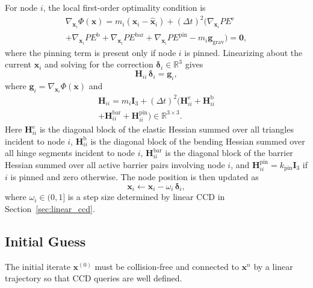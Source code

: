 \documentclass[acmtog,anonymous,review]{acmart}
\begin{document}
For node $i$, the local first-order optimality condition is
\begin{multline}
\label{eq:local_opt}
\nabla_{\mathbf{x}_i}\Phi(\mathbf{x})
=
m_i(\mathbf{x}_i-\hat{\mathbf{x}}_i)
+
(\Delta t)^2
\bigl(
\nabla_{\mathbf{x}_i}PE^{\mathrm{e}}
\\
+\nabla_{\mathbf{x}_i}PE^{\mathrm{b}}
+\nabla_{\mathbf{x}_i}PE^{\mathrm{bar}}
+\nabla_{\mathbf{x}_i}PE^{\mathrm{pin}}
-m_i\mathbf{g}_{\mathrm{grav}}
\bigr)
=\mathbf{0},
\end{multline}
where the pinning term is present only if node $i$ is pinned.
Linearizing about the current $\mathbf{x}_i$ and solving for the
correction $\boldsymbol{\delta}_i\in\mathbb{R}^3$ gives
\begin{equation}
\label{eq:local_newton}
\mathbf{H}_{ii}\,\boldsymbol{\delta}_i = \mathbf{g}_i,
\end{equation}
where $\mathbf{g}_i=\nabla_{\mathbf{x}_i}\Phi(\mathbf{x})$ and
\begin{multline}
\label{eq:local_hessian}
\mathbf{H}_{ii}
=
m_i\mathbf{I}_3
+
(\Delta t)^2
\bigl(
\mathbf{H}^{\mathrm{e}}_{ii}
+\mathbf{H}^{\mathrm{b}}_{ii}
\\
+\mathbf{H}^{\mathrm{bar}}_{ii}
+\mathbf{H}^{\mathrm{pin}}_{ii}
\bigr)
\in\mathbb{R}^{3\times 3}.
\end{multline}
Here $\mathbf{H}^{\mathrm{e}}_{ii}$ is the diagonal block of the
elastic Hessian summed over all triangles incident to node $i$,
$\mathbf{H}^{\mathrm{b}}_{ii}$ is the diagonal block of the bending
Hessian summed over all hinge segments incident to node $i$,
$\mathbf{H}^{\mathrm{bar}}_{ii}$ is the diagonal block of the barrier
Hessian summed over all active barrier pairs involving node $i$, and
$\mathbf{H}^{\mathrm{pin}}_{ii}=k_{\mathrm{pin}}\mathbf{I}_3$ if $i$
is pinned and zero otherwise. The node position is then updated as
\begin{equation}
\label{eq:node_update}
\mathbf{x}_i
\leftarrow
\mathbf{x}_i - \omega_i\,\boldsymbol{\delta}_i,
\end{equation}
where $\omega_i\in(0,1]$ is a step size determined by
linear CCD in
Section~\ref{sec:linear_ccd}.

\subsection{Initial Guess}
\label{sec:initial_guess}

The initial iterate $\mathbf{x}^{(0)}$ must be collision-free and
connected to $\mathbf{x}^n$ by a linear trajectory so that CCD
queries are well defined.
\end{document}
